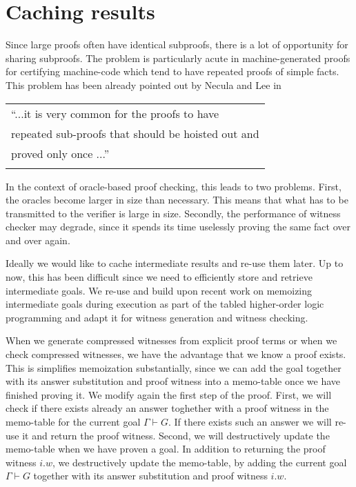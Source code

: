 \documentclass{acmconf}
\newcommand{\vd}{\vdash}
\begin{document}
\section{Caching results}
\label{sec:tabling}
Since large proofs often have identical subproofs,  there is a
lot of opportunity for sharing subproofs. The problem is particularly
acute in machine-generated proofs for certifying machine-code which
tend to have repeated proofs of simple facts. This problem has been
already pointed out by Necula and Lee in \cite{NeculaLee+97:resource}

 \begin{tabular}[h]{l}
``...it is very common for the proofs to have  \\
repeated sub-proofs that should be hoisted out and \\
proved only once ...'' \cite{NeculaLee+97:resource}\\ $\;$
 \end{tabular}


In the context of oracle-based proof checking, this leads to two
problems.  First, the oracles become larger in size than
necessary. This means that what has to be transmitted to the verifier
is large in size. Secondly, the performance of witness checker may
degrade, since it spends its time uselessly proving the same fact over
and over again. 

Ideally we would like to cache intermediate results and re-use them
later. Up to now, this has been difficult since we need to efficiently
store and retrieve intermediate goals. We re-use and build upon recent
work \cite{pientka:tabled} on memoizing intermediate goals during
execution as part of the tabled higher-order logic programming and
adapt it for witness generation and witness checking. 

When we generate compressed witnesses from explicit proof terms or
when we check compressed witnesses, we have the advantage that we know
a proof exists. This is simplifies memoization substantially, since we
can add the goal together with its answer substitution and proof
witness into a memo-table once we have finished proving it. We modify
again the first step of the proof. First, we will check if there
exists already an answer toghether with a proof witness in the memo-table for
the current goal $\Gamma \vd G$. If there exists such an answer we
will re-use it and return the proof witness. 
Second, we will destructively update the memo-table when we have
proven a goal. In addition to returning the proof witness $i . w$, we
destructively update the memo-table, by adding the current goal
$\Gamma \vd G$ together with its answer substitution and proof witness
$i . w$.  
\end{document}
